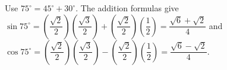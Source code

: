 Use $75^\circ=45^\circ+30^\circ$. The addition formulas give $\sin 75^\circ=(\dfrac{\sqrt{2}}{2})(\dfrac{\sqrt{3}}{2})+(\dfrac{\sqrt{2}}{2})(\dfrac{1}{2})=\boxed{\dfrac{\sqrt 6+\sqrt 2}{4}}$ and $\cos 75^\circ=(\dfrac{\sqrt{2}}{2})(\dfrac{\sqrt{3}}{2})-(\dfrac{\sqrt{2}}{2})(\dfrac{1}{2})=\boxed{\dfrac{\sqrt 6-\sqrt 2}{4}}$.
